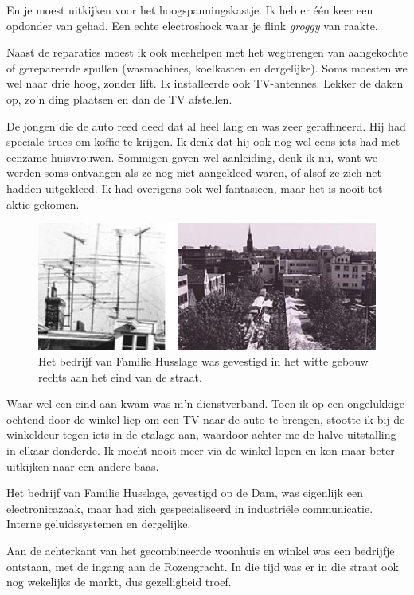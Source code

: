 \documentclass[10pt,twoside, openright]{memoir}
\begin{document}
En je moest uitkijken voor het hoogspanningskastje. Ik heb er één keer een opdonder van gehad. Een echte electroshock waar je flink \emph{groggy} van raakte.

Naast de reparaties moest ik ook meehelpen met het wegbrengen van aangekochte of gerepareerde spullen (wasmachines, koelkasten en dergelijke). Soms moesten we wel naar drie hoog, zonder lift. Ik installeerde ook TV-antennes. Lekker de daken op, zo’n ding plaatsen en dan de TV afstellen. 

De jongen die de auto reed deed dat al heel lang en was zeer geraffineerd. Hij had speciale trucs om koffie te krijgen. Ik denk dat hij ook nog wel eens iets had met eenzame huisvrouwen. Sommigen gaven wel aanleiding, denk ik nu, want we werden soms ontvangen als ze nog niet aangekleed waren, of alsof ze zich net hadden uitgekleed. Ik had overigens ook wel fantasieën, maar het is nooit tot aktie gekomen. 

\begin{figure}
\includegraphics[width=\textwidth]{img/ch32/antennae}
\caption*{\footnotesize Het bedrijf van Familie Husslage was gevestigd in het witte gebouw rechts aan het eind van de straat.}
\end{figure}

Waar wel een eind aan kwam was m’n dienstverband. Toen ik op een ongelukkige ochtend door de winkel liep om een TV naar de auto te brengen, stootte ik bij de winkeldeur tegen iets in de etalage aan, waardoor achter me de halve uitstalling in elkaar donderde. Ik mocht nooit meer via de winkel lopen en kon maar beter uitkijken naar een andere baas.

Het bedrijf van Familie Husslage, gevestigd op de Dam, was eigenlijk een electronicazaak, maar had zich gespecialiseerd in industriële communicatie. Interne geluidssystemen en dergelijke. 

Aan de achterkant van het gecombineerde woonhuis en winkel was een bedrijfje ontstaan, met de ingang aan de Rozengracht. In die tijd was er in die straat ook nog wekelijks de markt, dus gezelligheid troef. 
\end{document}
